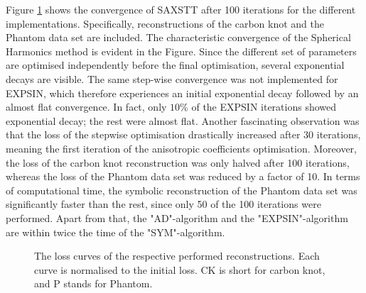 Figure \ref{fig:Loss_curve_optimal} shows the convergence of SAXSTT after 100 iterations for the different implementations.
Specifically, reconstructions of the carbon knot and the Phantom data set are included.
The characteristic convergence of the Spherical Harmonics method is evident in the Figure.
Since the different set of parameters are optimised independently before the final optimisation, several exponential decays are visible.
The same step-wise convergence was not implemented for EXPSIN, which therefore experiences an initial exponential decay followed by an almost flat convergence.
In fact, only $10\%$ of the EXPSIN iterations showed exponential decay; the rest were almost flat.
Another fascinating observation was that the loss of the stepwise optimisation drastically increased after 30 iterations, meaning the first iteration of the anisotropic coefficients optimisation.
Moreover, the loss of the carbon knot reconstruction was only halved after 100 iterations, whereas the loss of the Phantom data set was reduced by a factor of 10.
In terms of computational time, the symbolic reconstruction of the Phantom data set was significantly faster than the rest, since only 50 of the 100 iterations were performed.
Apart from that, the "AD"-algorithm and the "EXPSIN"-algorithm are within twice the time of the "SYM"-algorithm.



\begin{figure}[h!]
    \centering
    \caption{ The loss curves of the respective performed reconstructions. Each curve is normalised to the initial loss.
        CK is short for carbon knot, and P stands for Phantom. }
    \label{fig:Loss_curve_optimal}
\end{figure}